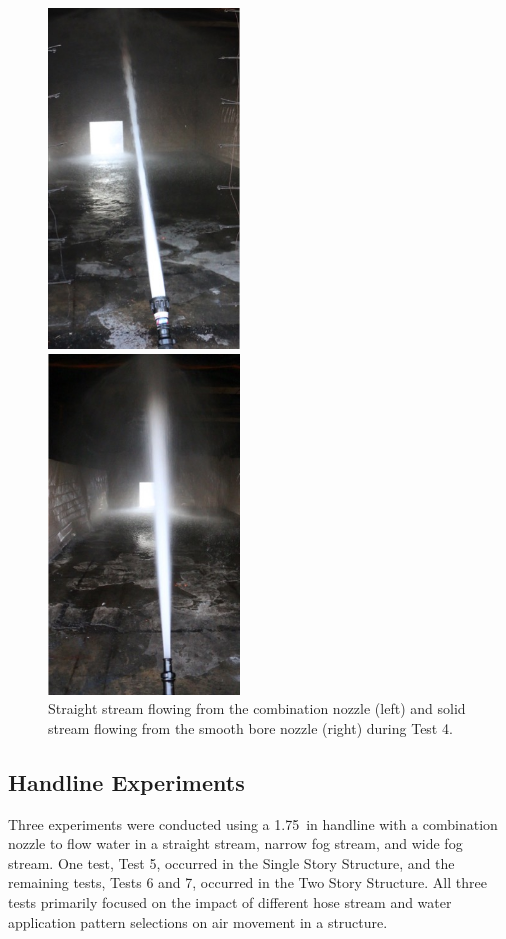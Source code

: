 \documentclass[12pt,oneside]{book}
\begin{document}
\begin{figure}[!ht]
	\minipage{2.15in}
	\begin{center}
		\includegraphics[width=2in]{../Figures/Pictures/SS_70}
	\end{center} 
	\endminipage
	\minipage{2.15in}
	\begin{center}
		\includegraphics[width=2in]{../Figures/Pictures/SB_70}
	\end{center}
	\endminipage
	\caption[Straight stream from combination nozzle and solid stream from smooth bore nozzle with 1~in tip during Test 4.]{Straight stream flowing from the combination nozzle (left) and solid stream flowing from the smooth bore nozzle (right) during Test 4.}
	\label{fig:test_4_pic}
\end{figure}
\FloatBarrier

\subsection{Handline Experiments}
\label{sec:handline_procedure}
Three experiments were conducted using a 1.75~in handline with a combination nozzle to flow water in a straight stream, narrow fog stream, and wide fog stream. One test, Test 5, occurred in the Single Story Structure, and the remaining tests, Tests 6 and 7, occurred in the Two Story Structure. All three tests primarily focused on the impact of different hose stream and water application pattern selections on air movement in a structure. 
\end{document}
